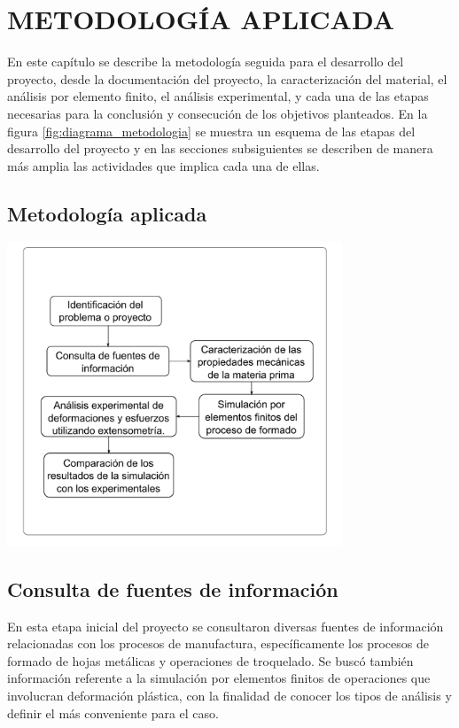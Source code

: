 \chapter{METODOLOGÍA APLICADA}

En este capítulo se describe la metodología seguida para el desarrollo del proyecto, 
desde la documentación del proyecto, la caracterización del material, el análisis por 
elemento finito, el análisis experimental, y cada una de las etapas necesarias para 
la conclusión y consecución de los objetivos planteados. En la figura \ref{fig:diagrama_metodologia} 
se muestra un esquema de las etapas del desarrollo del proyecto y en las secciones 
subsiguientes se describen de manera más amplia las actividades que implica cada una de ellas.

\section{Metodología aplicada}

\begin{center}
\includegraphics[width=0.75\textwidth]{src/ch3/diagrama_metodologia.pdf}
\label{fig:diagrama_metodologia}
\end{center}

\section{Consulta de fuentes de información}

En esta etapa inicial del proyecto se consultaron diversas fuentes de información 
relacionadas con los procesos de manufactura, específicamente los procesos 
de formado de hojas metálicas y operaciones de troquelado. Se buscó también información 
referente a la simulación por elementos finitos de operaciones que involucran 
deformación plástica, con la finalidad de conocer los tipos de análisis y definir 
el más conveniente para el caso. \\

